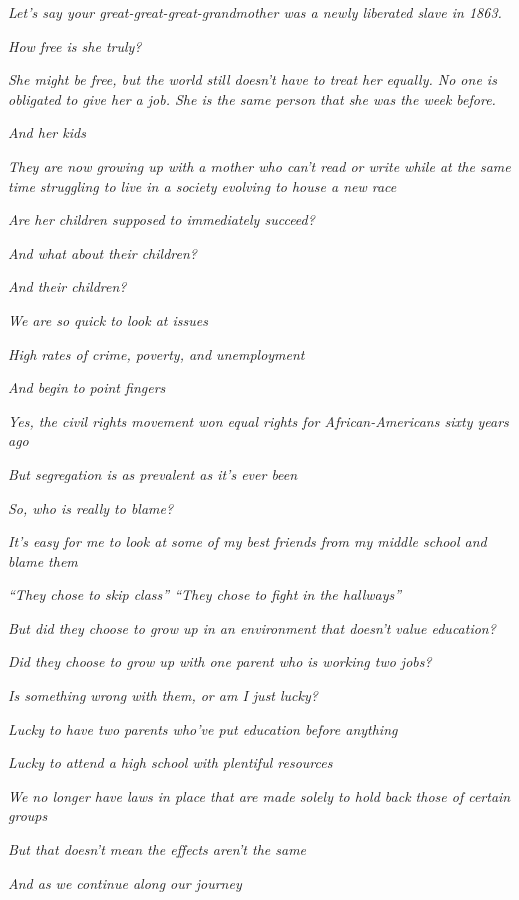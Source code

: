 \emph{Let's say your great-great-great-grandmother was a newly liberated
slave in 1863.}

\emph{How free is she truly?}

\emph{She might be free, but the world still doesn't have to treat her
equally. No one is obligated to give her a job. She is the same person
that she was the week before.}

\emph{And her kids}

\emph{They are now growing up with a mother who can't read or write
while at the same time struggling to live in a society evolving to house
a new race}

\emph{Are her children supposed to immediately succeed?}

\emph{And what about their children?}

\emph{And their children?}

\emph{We are so quick to look at issues}

\emph{High rates of crime, poverty, and unemployment}

\emph{And begin to point fingers}

\emph{Yes, the civil rights movement won equal rights for
African-Americans sixty years ago}

\emph{But segregation is as prevalent as it's ever been}

\emph{So, who is really to blame?}

\emph{It's easy for me to look at some of my best friends from my middle
school and blame them}

\emph{``They chose to skip class'' ``They chose to fight in the
hallways''}

\emph{But did they choose to grow up in an environment that doesn't
value education?}

\emph{Did they choose to grow up with one parent who is working two
jobs?}

\emph{Is something wrong with them, or am I just lucky?}

\emph{Lucky to have two parents who've put education before anything}

\emph{Lucky to attend a high school with plentiful resources}

\emph{We no longer have laws in place that are made solely to hold back
those of certain groups}

\emph{But that doesn't mean the effects aren't the same}

\emph{And as we continue along our journey}

